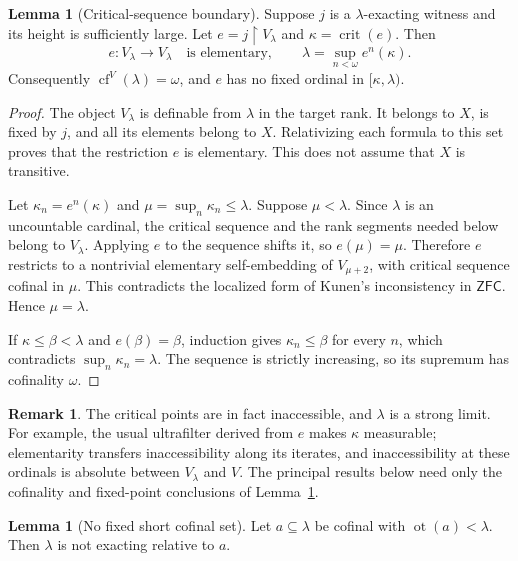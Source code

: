 \documentclass[11pt,letterpaper]{article}
\theoremstyle{definition}
\newtheorem{lemma}[definition]{Lemma}
\newcommand{\ZFC}{\mathsf{ZFC}}
\newcommand{\crit}{\operatorname{crit}}
\newcommand{\cf}{\operatorname{cf}}
\newcommand{\ot}{\operatorname{ot}}
\newcommand{\restr}{\mathbin{\upharpoonright}}
\newtheorem{remark}[definition]{Remark}
\begin{document}
\begin{lemma}[Critical-sequence boundary]\label{lem:critical}
Suppose $j$ is a $\lambda$-exacting witness and its height is sufficiently large. Let $e=j\restr V_\lambda$ and $\kappa=\crit(e)$. Then
\[
 e:V_\lambda\longrightarrow V_\lambda
 \quad\text{is elementary},\qquad
 \lambda=\sup_{n<\omega}e^n(\kappa).
\]
Consequently $\cf^V(\lambda)=\omega$, and $e$ has no fixed ordinal in $[\kappa,\lambda)$.
\end{lemma}

\begin{proof}
The object $V_\lambda$ is definable from $\lambda$ in the target rank. It belongs to $X$, is fixed by $j$, and all its elements belong to $X$. Relativizing each formula to this set proves that the restriction $e$ is elementary. This does not assume that $X$ is transitive.

Let $\kappa_n=e^n(\kappa)$ and $\mu=\sup_n\kappa_n\leq\lambda$. Suppose $\mu<\lambda$. Since $\lambda$ is an uncountable cardinal, the critical sequence and the rank segments needed below belong to $V_\lambda$. Applying $e$ to the sequence shifts it, so $e(\mu)=\mu$. Therefore $e$ restricts to a nontrivial elementary self-embedding of $V_{\mu+2}$, with critical sequence cofinal in $\mu$. This contradicts the localized form of Kunen's inconsistency in $\ZFC$.\cite{kunen,hkp} Hence $\mu=\lambda$.

If $\kappa\leq\beta<\lambda$ and $e(\beta)=\beta$, induction gives $\kappa_n\leq\beta$ for every $n$, which contradicts $\sup_n\kappa_n=\lambda$. The sequence is strictly increasing, so its supremum has cofinality $\omega$.
\end{proof}

\begin{remark}
The critical points are in fact inaccessible, and $\lambda$ is a strong limit. For example, the usual ultrafilter derived from $e$ makes $\kappa$ measurable; elementarity transfers inaccessibility along its iterates, and inaccessibility at these ordinals is absolute between $V_\lambda$ and $V$. The principal results below need only the cofinality and fixed-point conclusions of Lemma~\ref{lem:critical}.
\end{remark}

\begin{lemma}[No fixed short cofinal set]\label{lem:cofinal}
Let $a\subseteq\lambda$ be cofinal with $\ot(a)<\lambda$. Then $\lambda$ is not exacting relative to $a$.
\end{lemma}
\end{document}
